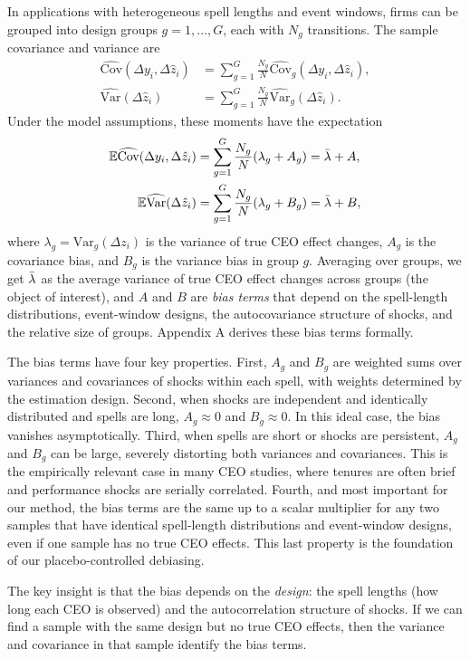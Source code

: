 \documentclass[11pt,a4paper]{article}
\newcommand{\Var}{\text{Var}}
\newcommand{\Cov}{\text{Cov}}
\begin{document}
In applications with heterogeneous spell lengths and event windows, firms can be grouped into design groups $g=1,\ldots,G$, each with $N_g$ transitions. The sample covariance and variance are
\begin{align}
\widehat{\Cov}(\Delta y_i,\Delta \hat z_i) &= \sum_{g=1}^G \frac{N_g}{N} \widehat{\Cov}_g(\Delta y_i,\Delta \hat z_i),\\
\widehat{\Var}(\Delta \hat z_i) &= \sum_{g=1}^G \frac{N_g}{N} \widehat{\Var}_g(\Delta \hat z_i).
\end{align}
Under the model assumptions, these moments have the expectation
\begin{align}
\mathbb E\widehat{\Cov}(\Delta y_i,\Delta \hat z_i) &= 
  \sum_{g=1}^G \frac{N_g}{N} (\lambda_g + A_g) = \Bar\lambda + A,\\
\mathbb E\widehat{\Var}(\Delta \hat z_i) &= 
\sum_{g=1}^G \frac{N_g}{N} (\lambda_g + B_g) = \Bar\lambda + B,
\end{align}
where $\lambda_g = \Var_g(\Delta z_i)$ is the variance of true CEO effect changes, $A_g$ is the covariance bias, and $B_g$ is the variance bias in group $g$. Averaging over groups, we get $\Bar\lambda$ as the average variance of true CEO effect changes across groups (the object of interest), and $A$ and $B$ are \emph{bias terms} that depend on the spell-length distributions, event-window designs, the autocovariance structure of shocks, and the relative size of groups. Appendix A derives these bias terms formally.

The bias terms have four key properties. First, $A_g$ and $B_g$ are weighted sums over variances and covariances of shocks within each spell, with weights determined by the estimation design. Second, when shocks are independent and identically distributed and spells are long, $A_g\approx 0$ and $B_g\approx 0$. In this ideal case, the bias vanishes asymptotically. Third, when spells are short or shocks are persistent, $A_g$ and $B_g$ can be large, severely distorting both variances and covariances. This is the empirically relevant case in many CEO studies, where tenures are often brief and performance shocks are serially correlated. Fourth, and most important for our method, the bias terms are the same up to a scalar multiplier for any two samples that have identical spell-length distributions and event-window designs, even if one sample has no true CEO effects. This last property is the foundation of our placebo-controlled debiasing.

The key insight is that the bias depends on the \emph{design}: the spell lengths (how long each CEO is observed) and the autocorrelation structure of shocks. If we can find a sample with the same design but no true CEO effects, then the variance and covariance in that sample identify the bias terms. 
\end{document}
